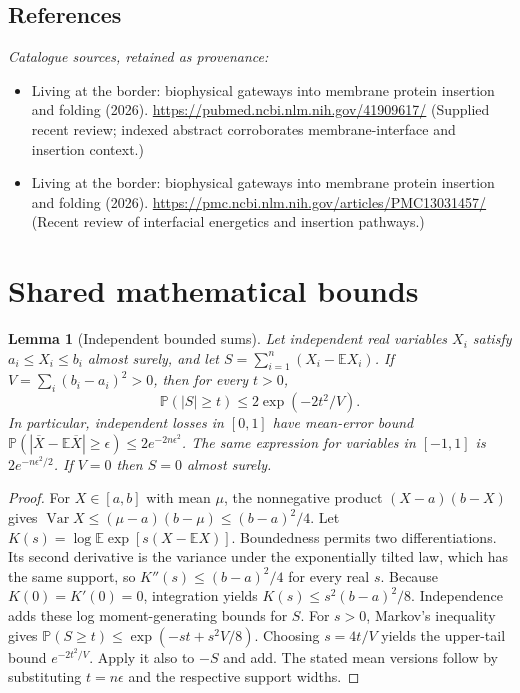 \documentclass[11pt]{article}
\newcommand{\E}{\mathbb E}
\newcommand{\Prob}{\mathbb P}
\DeclareMathOperator{\Var}{Var}
\providecommand{\E}{\mathbb E}
\providecommand{\Prob}{\mathbb P}
\providecommand{\Var}{\operatorname{Var}}
\newtheorem{sharedlemma}{Lemma}[section]
\begin{document}
\subsection{References}
\noindent\emph{Catalogue sources, retained as provenance:}
\begin{itemize}
\item Living at the border: biophysical gateways into membrane protein insertion and folding (2026). \url{https://pubmed.ncbi.nlm.nih.gov/41909617/} (Supplied recent review; indexed abstract corroborates membrane-interface and insertion context.)
\item Living at the border: biophysical gateways into membrane protein insertion and folding (2026). \url{https://pmc.ncbi.nlm.nih.gov/articles/PMC13031457/} (Recent review of interfacial energetics and insertion pathways.)
\end{itemize}
\clearpage


\appendix
\section{Shared mathematical bounds}\label{app:bounds}
\begin{sharedlemma}[Independent bounded sums]\label{lem:bounded}
Let independent real variables $X_i$ satisfy $a_i\leq X_i\leq b_i$ almost surely,
and let $S=\sum_{i=1}^n(X_i-\E X_i)$. If
$V=\sum_i(b_i-a_i)^2>0$, then for every $t>0$,
\[
 \Prob(|S|\geq t)\leq 2\exp(-2t^2/V).
\]
In particular, independent losses in $[0,1]$ have mean-error bound
$\Prob(|\overline X-\E\overline X|\geq\epsilon)
\leq2e^{-2n\epsilon^2}$. The same expression for variables in $[-1,1]$
is $2e^{-n\epsilon^2/2}$. If $V=0$ then $S=0$ almost surely.
\end{sharedlemma}
\begin{proof}
For $X\in[a,b]$ with mean $\mu$, the nonnegative product
$(X-a)(b-X)$ gives
$\Var X\leq(\mu-a)(b-\mu)\leq(b-a)^2/4$.
Let $K(s)=\log\E\exp[s(X-\E X)]$.
Boundedness permits two differentiations. Its second derivative is the variance
under the exponentially tilted law, which has the same support, so
$K''(s)\leq(b-a)^2/4$ for every real $s$.
Because $K(0)=K'(0)=0$, integration yields
$K(s)\leq s^2(b-a)^2/8$.
Independence adds these log moment-generating bounds for $S$.
For $s>0$, Markov's inequality gives
$\Prob(S\geq t)\leq\exp(-st+s^2V/8)$.
Choosing $s=4t/V$ yields the upper-tail bound $e^{-2t^2/V}$.
Apply it also to $-S$ and add. The stated mean versions follow by substituting
$t=n\epsilon$ and the respective support widths.
\end{proof}
\end{document}
